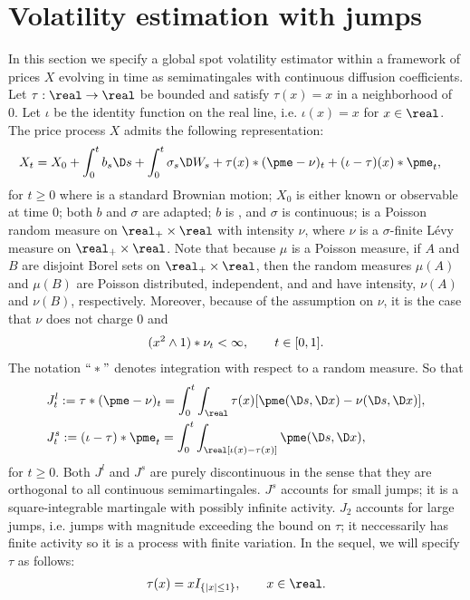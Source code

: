 \section{Volatility estimation with jumps} 
In this section we specify a global spot volatility estimator within a framework of prices $X$ evolving in time as \ito semimatingales with continuous diffusion coefficients. 
 Let $\tau: \real \to \real$ be bounded and satisfy $\tau(x) = x$ in a neighborhood of 0.  Let $\iota$ be the identity  function on the real line, i.e.  $\iota(x) = x$ for $x \in \real$. The price process $X$ admits the following  representation:
\begin{align}
  X_t & = X_0 + \int_0^t b_s \D s + \int_0^t \sigma_s \D W_s +  \tau(x)\ast (\pme  - \nu)_t  + (\iota - \tau)(x)\ast \pme_t ,   
  \label{eq:generalsemimartingale}
\end{align}
for $t \ge 0$  where  \sbm is a standard Brownian motion;  $X_0$ is either known or observable at time 0;  both $b$ and $\sigma$ are adapted; $b$ is \cadlag, and $\sigma$ is continuous;  \pme is a Poisson random measure on $\real_+ \times \real$ with intensity $\nu$, where $\nu$ is a  $\sigma$-finite L\'evy  measure on $\real_+ \times \real$. Note that because $\mu$ is a Poisson measure, if $A$ and $B$ are disjoint Borel sets on $\real_+ \times \real$, then the random measures $\mu(A)$ and $\mu(B)$ are Poisson distributed, independent, and  and have intensity, $\nu(A)$ and $\nu(B)$, respectively. Moreover, because of the \levy assumption on $\nu$, it is the case that $\nu$ does not charge 0 and 
\begin{align}
  (x^2 \wedge 1) \ast\nu_t < \infty, \qquad t \in [0,1].\notag
  \label{}
\end{align}
The  notation $``\ast"$ denotes integration with respect to a random measure. So that 
\begin{align}
  &J_{t}^l :=  \tau\ast (\pme  - \nu)_t = \int_0^t\int_\real \tau(x) [\pme(\D s, \D x)   -  \nu(\D s,\D x)], \notag\\
  & J_{t}^s:= (\iota - \tau)\ast \pme_t = \int_0^t\int_\real [\iota(x) - \tau(x)] \pme(\D s, \D x), \notag
  \label{}
\end{align}
for $t \ge 0$. Both  $J^l$ and $J^s$ are purely discontinuous in the sense that they are orthogonal to all continuous semimartingales. $J^s$ accounts for  small jumps; it is a square-integrable martingale with possibly infinite activity. $J_2$ accounts for large jumps, i.e. jumps with magnitude exceeding the bound on $\tau$; it neccessarily has finite activity so it is a process with finite variation. In the sequel, we will specify $\tau$ as follows:
\begin{align}
  \tau(x) = xI_{\{\vert x \vert \le 1\}}, \qquad x \in \real. \notag
  \label{}
\end{align}

